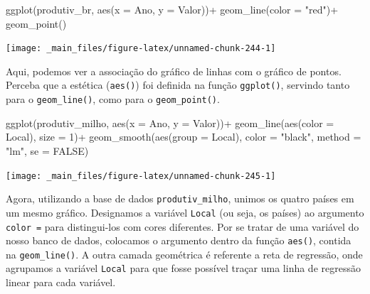 \documentclass[
  brazilian,
]{book}
\newenvironment{Shaded}{\begin{snugshade}}{\end{snugshade}}
\newcommand{\AttributeTok}[1]{\textcolor[rgb]{0.77,0.63,0.00}{#1}}
\newcommand{\ConstantTok}[1]{\textcolor[rgb]{0.00,0.00,0.00}{#1}}
\newcommand{\DecValTok}[1]{\textcolor[rgb]{0.00,0.00,0.81}{#1}}
\newcommand{\FunctionTok}[1]{\textcolor[rgb]{0.00,0.00,0.00}{#1}}
\newcommand{\NormalTok}[1]{#1}
\newcommand{\SpecialCharTok}[1]{\textcolor[rgb]{0.00,0.00,0.00}{#1}}
\newcommand{\StringTok}[1]{\textcolor[rgb]{0.31,0.60,0.02}{#1}}
\begin{document}
\begin{Shaded}
\begin{Highlighting}[]
\FunctionTok{ggplot}\NormalTok{(produtiv\_br,}
       \FunctionTok{aes}\NormalTok{(}\AttributeTok{x =}\NormalTok{ Ano,}
           \AttributeTok{y =}\NormalTok{ Valor))}\SpecialCharTok{+}
  \FunctionTok{geom\_line}\NormalTok{(}\AttributeTok{color =} \StringTok{"red"}\NormalTok{)}\SpecialCharTok{+}
  \FunctionTok{geom\_point}\NormalTok{()}
\end{Highlighting}
\end{Shaded}

\begin{center}\texttt{[image: \_main\_files/figure-latex/unnamed-chunk-244-1]} \end{center}

Aqui, podemos ver a associação do gráfico de linhas com o gráfico de pontos. Perceba que a estética (\texttt{aes()}) foi definida na função \texttt{ggplot()}, servindo tanto para o \texttt{geom\_line()}, como para o \texttt{geom\_point()}.

\begin{Shaded}
\begin{Highlighting}[]
\FunctionTok{ggplot}\NormalTok{(produtiv\_milho, }
       \FunctionTok{aes}\NormalTok{(}\AttributeTok{x =}\NormalTok{ Ano,}
           \AttributeTok{y =}\NormalTok{ Valor))}\SpecialCharTok{+}
  \FunctionTok{geom\_line}\NormalTok{(}\FunctionTok{aes}\NormalTok{(}\AttributeTok{color =}\NormalTok{ Local),}
            \AttributeTok{size =} \DecValTok{1}\NormalTok{)}\SpecialCharTok{+}
  \FunctionTok{geom\_smooth}\NormalTok{(}\FunctionTok{aes}\NormalTok{(}\AttributeTok{group =}\NormalTok{ Local),}
              \AttributeTok{color =} \StringTok{"black"}\NormalTok{,}
              \AttributeTok{method =} \StringTok{"lm"}\NormalTok{,}
              \AttributeTok{se =} \ConstantTok{FALSE}\NormalTok{)}
\end{Highlighting}
\end{Shaded}

\begin{center}\texttt{[image: \_main\_files/figure-latex/unnamed-chunk-245-1]} \end{center}

Agora, utilizando a base de dados \texttt{produtiv\_milho}, unimos os quatro países em um mesmo gráfico. Designamos a variável \texttt{Local} (ou seja, os países) ao argumento \texttt{color\ =} para distingui-los com cores diferentes. Por se tratar de uma variável do nosso banco de dados, colocamos o argumento dentro da função \texttt{aes()}, contida na \texttt{geom\_line()}. A outra camada geométrica é referente a reta de regressão, onde agrupamos a variável \texttt{Local} para que fosse possível traçar uma linha de regressão linear para cada variável.
\end{document}
